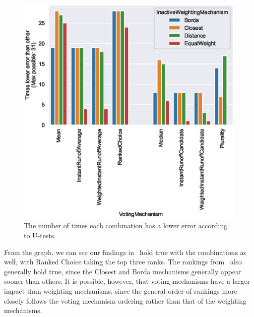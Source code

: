 \begin{figure}[htbp]
    \centering
    \includegraphics[scale=0.75]
    {./content/figures/combinations/combined_lesser_counts}
    \caption{The number of times each combination has a lower error according to
    U-tests.}
    \label{fig:combined-lesser_counts}
\end{figure}

From the graph, we can see our findings in~
hold true with the combinations as well, with Ranked Choice taking the top three ranks.
The rankings from~ also
generally hold true, since the Closest and Borda mechanisms generally
appear sooner than others.
It is possible, however, that voting mechanisms have a larger impact than weighting
mechanisms, since the general order of rankings more closely follows the voting
mechanism ordering rather than that of the weighting mechanisms.

%
%


